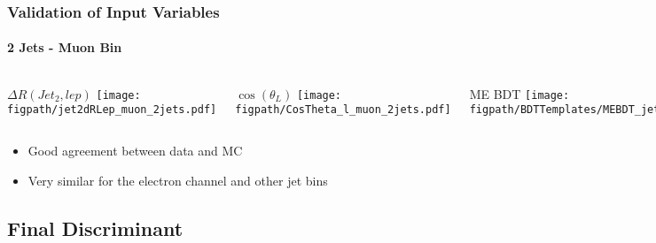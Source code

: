 \begin{frame}
	\frametitle{Validation of Input Variables}
	\framesubtitle{2 Jets - Muon Bin}
	\begin{columns}[T]
			\begin{block}{\scriptsize ${\Delta}R(Jet_{2},lep)$}
				\texttt{[image: \\figpath/jet2dRLep\_muon\_2jets.pdf]}%
			\end{block}
			\begin{block}{\scriptsize $\cos(\theta_{L})$}
				\texttt{[image: \\figpath/CosTheta\_l\_muon\_2jets.pdf]}%
			\end{block}
			\begin{block}{\scriptsize ME BDT}
				\texttt{[image: \\figpath/BDTTemplates/MEBDT\_jets2\_muon.png]}%
			\end{block}
	\end{columns}
	\begin{block}{}
		\begin{itemize}
			\item Good agreement between data and MC
			\item Very similar for the electron channel and other jet bins
		\end{itemize}
	\end{block}
\end{frame}


\subsection*{Final Discriminant}


